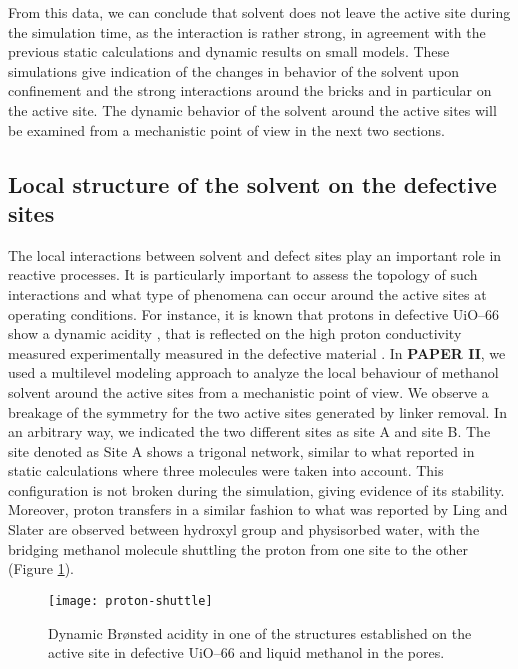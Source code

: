 \npar
From this data, we can conclude that solvent does not leave the active site during the simulation time, as the interaction is rather strong, in agreement with the previous static calculations and dynamic results on small models. These simulations give indication of the changes in behavior of the solvent upon confinement and the strong interactions around the bricks and in particular on the active site. The dynamic behavior of the solvent around the active sites will be examined from a mechanistic point of view in the next two sections.

\subsection*{Local structure of the solvent on the defective sites}
The local interactions between solvent and defect sites play an important role in reactive processes. It is particularly important to assess the topology of such interactions and what type of phenomena can occur around the active sites at operating conditions. For instance, it is known that protons in defective UiO--66 show a dynamic acidity \cite{ling2016dynamic}, that is reflected on the high proton conductivity measured experimentally measured in the defective material \cite{taylor2015defect}.
\npar
In \textbf{PAPER II}, we used a multilevel modeling approach to analyze the local behaviour of methanol solvent around the active sites from a mechanistic point of view. We observe a breakage of the symmetry for the two active sites generated by linker removal. In an arbitrary way, we indicated the two different sites as site A and site B. The site denoted as Site A shows a trigonal network, similar to what reported in static calculations where three molecules were taken into account. This configuration is not broken during the simulation, giving evidence of its stability. Moreover, proton transfers in a similar fashion to what was reported by Ling and Slater \cite{ling2016dynamic} are observed between hydroxyl group and physisorbed water, with the bridging methanol molecule shuttling the proton from one site to the other (Figure \ref{fig:proton-shuttle}). 
\begin{figure}[!htb]
	\centering
	\texttt{[image: proton-shuttle]}
	\caption{Dynamic Br\o{}nsted acidity in one of the structures established on the active site in defective UiO--66 and liquid methanol in the pores.}
	\label{fig:proton-shuttle}
\end{figure}
